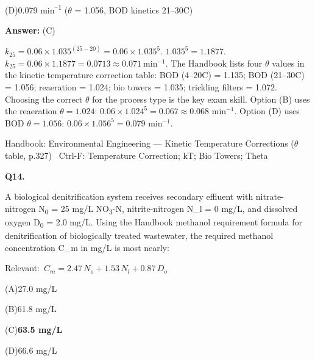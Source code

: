 \documentclass[11pt]{article}
\newcommand{\correct}[1]{\textbf{#1}\;{\color{accent}$\checkmark$}}
\newcommand{\optline}[2]{\par\noindent\hspace{1.2em}(#1)\hspace{0.6em}#2}
\begin{document}
\optline{D}{0.079 min\textsuperscript{--}\textsuperscript{1}  ($\theta$ = 1.056, BOD kinetics 21--30\textdegree{}C)}
\par\vspace{3pt}
\vspace{2pt}\par\noindent\colorbox{boxbg}{\parbox{\dimexpr\linewidth-2\fboxsep\relax}{%
\vspace{2pt}\textbf{Answer:} (C)\par\vspace{2pt}
{\small $k_{25} = 0.06\times1.035^{(25-20)} = 0.06\times1.035^5$.  $1.035^5 = 1.1877$.  $k_{25} = 0.06\times1.1877 = 0.0713\approx0.071\ \mathrm{min^{-1}}$. The Handbook lists four $\theta$ values in the kinetic temperature correction table: BOD (4--20\textdegree{}C) = 1.135; BOD (21--30\textdegree{}C) = 1.056; reaeration = 1.024; bio towers = 1.035; trickling filters = 1.072. Choosing the correct $\theta$ for the process type is the key exam skill. Option (B) uses the reaeration $\theta = 1.024$: $0.06\times1.024^5 = 0.067\approx0.068$ min$^{-1}$. Option (D) uses BOD $\theta = 1.056$: $0.06\times1.056^5 = 0.079$ min$^{-1}$.}\par\vspace{2pt}
{\footnotesize\color{soft}Handbook: Environmental Engineering --- Kinetic Temperature Corrections ($\theta$ table, p.327) \textbullet\ Ctrl-F: Temperature Correction; kT; Bio Towers; Theta}\vspace{2pt}
}}
\vspace{9pt}
\filbreak
\textbf{\color{accent}Q14.}\par\vspace{2pt}
A biological denitrification system receives secondary effluent with nitrate-nitrogen N\textsubscript{0} = 25 mg/L NO\textsubscript{3}-N, nitrite-nitrogen N\_l = 0 mg/L, and dissolved oxygen D\textsubscript{0} = 2.0 mg/L. Using the Handbook methanol requirement formula for denitrification of biologically treated wastewater, the required methanol concentration C\_m in mg/L is most nearly:\par\vspace{3pt}
{\small\color{soft}Relevant:}\ $C_m = 2.47\,N_o + 1.53\,N_l + 0.87\,D_o$\par\vspace{3pt}
\optline{A}{27.0 mg/L}
\optline{B}{61.8 mg/L}
\optline{C}{\correct{63.5 mg/L}}
\optline{D}{66.6 mg/L}
\par\vspace{3pt}
\end{document}
